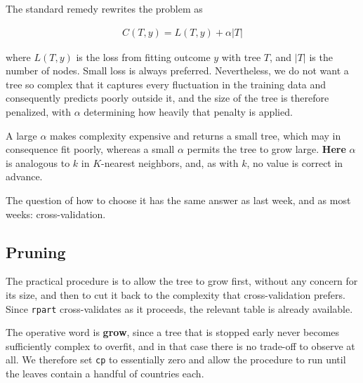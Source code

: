 \documentclass[
  a4paper,
]{scrbook}
\begin{document}
The standard remedy rewrites the problem as

\begin{align}
C(T, y) = L(T, y) + \alpha |T|
\end{align}

where \(L(T, y)\) is the loss from fitting outcome \(y\) with tree
\(T\), and \(|T|\) is the number of nodes. Small loss is always
preferred. Nevertheless, we do not want a tree so complex that it
captures every fluctuation in the training data and consequently
predicts poorly outside it, and the size of the tree is therefore
penalized, with \(\alpha\) determining how heavily that penalty is
applied.

A large \(\alpha\) makes complexity expensive and returns a small tree,
which may in consequence fit poorly, whereas a small \(\alpha\) permits
the tree to grow large. \textbf{Here} \(\alpha\) is analogous to \(k\)
in \(K\)-nearest neighbors, and, as with \(k\), no value is correct in
advance.

The question of how to choose it has the same answer as last week, and
as most weeks: cross-validation.

\subsection{Pruning}\label{pruning}

The practical procedure is to allow the tree to grow first, without any
concern for its size, and then to cut it back to the complexity that
cross-validation prefers. Since \texttt{rpart} cross-validates as it
proceeds, the relevant table is already available.

The operative word is \textbf{grow}, since a tree that is stopped early
never becomes sufficiently complex to overfit, and in that case there is
no trade-off to observe at all. We therefore set \texttt{cp} to
essentially zero and allow the procedure to run until the leaves contain
a handful of countries each.
\end{document}
